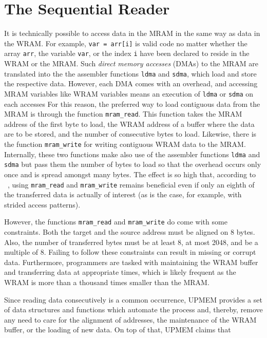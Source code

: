 \section{The Sequential Reader}
\label{sec:mram:seq_reader}

It is technically possible to access data in the MRAM in the same way as data in the WRAM.
For example, \lstinline|var = arr[i]| is valid code no matter whether the array \lstinline|arr|, the variable \lstinline|var|, or the index \lstinline|i| have been declared to reside in the WRAM or the MRAM.
Such \emph{direct memory accesses} (DMAs) to the MRAM are translated into the the assembler functions \lstinline|ldma| and \lstinline|sdma|, which load and store the respective data.
However, each DMA comes with an overhead, and accessing MRAM variables like WRAM variables means an execution of \lstinline|ldma| or \lstinline|sdma| on each accesses
For this reason, the preferred way to load contiguous data from the MRAM is through the function \lstinline|mram_read|.
This function takes the MRAM address of the first byte to load, the WRAM address of a buffer where the data are to be stored, and the number of consecutive bytes to load.
Likewise, there is the function \lstinline|mram_write| for writing contiguous WRAM data to the MRAM.
Internally, these two \langC{} functions make also use of the assembler functions \lstinline|ldma| and \lstinline|sdma| but pass them the number of bytes to load so that the overhead occurs only once and is spread amongst many bytes.
The effect is so high that, according to \citeauthor{mutlu2022Benchmarking}~\cite[11]{mutlu2022Benchmarking}, using \lstinline|mram_read| and \lstinline|mram_write| remains beneficial even if only an eighth of the transferred data is actually of interest (as is the case, for example, with strided access patterns).

However, the functions \lstinline|mram_read| and \lstinline|mram_write| do come with some constraints.
Both the target and the source address must be aligned on 8 bytes.
Also, the number of transferred bytes must be at least 8, at most 2048, and be a multiple of 8.
Failing to follow these constraints can result in missing or corrupt data.
Furthermore, programmers are tasked with maintaining the WRAM buffer and transferring data at appropriate times, which is likely frequent as the WRAM is more than a thousand times smaller than the MRAM.

Since reading data consecutively is a common occurrence, UPMEM provides a set of data structures and \langC{} functions which automate the process and, thereby, remove any need to care for the alignment of addresses, the maintenance of the WRAM buffer, or the loading of new data.
On top of that, UPMEM claims that ~\cite[Memory management -- Sequential readers]{upmemSDK}

